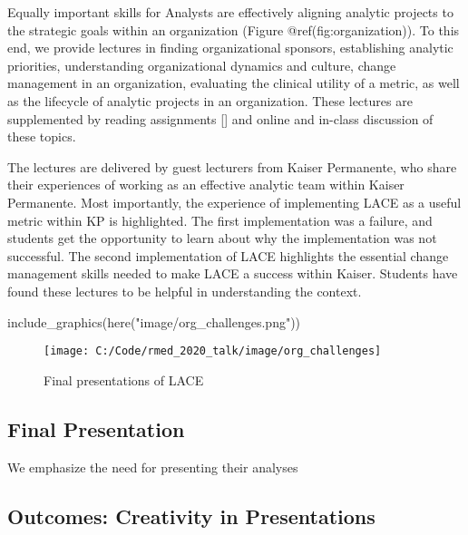Equally important skills for Analysts are effectively aligning analytic
projects to the strategic goals within an organization (Figure
@ref(fig:organization)). To this end, we provide lectures in finding
organizational sponsors, establishing analytic priorities, understanding
organizational dynamics and culture, change management in an
organization, evaluating the clinical utility of a metric, as well as
the lifecycle of analytic projects in an organization. These lectures
are supplemented by reading assignments {[}{]} and online and in-class
discussion of these topics.

The lectures are delivered by guest lecturers from Kaiser Permanente,
who share their experiences of working as an effective analytic team
within Kaiser Permanente. Most importantly, the experience of
implementing LACE as a useful metric within KP is highlighted. The first
implementation was a failure, and students get the opportunity to learn
about why the implementation was not successful. The second
implementation of LACE highlights the essential change management skills
needed to make LACE a success within Kaiser. Students have found these
lectures to be helpful in understanding the context.

\begin{Schunk}
\begin{Sinput}
include_graphics(here("image/org_challenges.png"))
\end{Sinput}
\begin{figure}

{\centering \texttt{[image: C:/Code/rmed\_2020\_talk/image/org\_challenges]} 

}

\caption[Final presentations of LACE]{Final presentations of LACE}\label{fig:organization}
\end{figure}
\end{Schunk}

\hypertarget{final-presentation}{%
\subsection{Final Presentation}\label{final-presentation}}

We emphasize the need for presenting their analyses

\hypertarget{outcomes-creativity-in-presentations}{%
\subsection{Outcomes: Creativity in
Presentations}\label{outcomes-creativity-in-presentations}}

